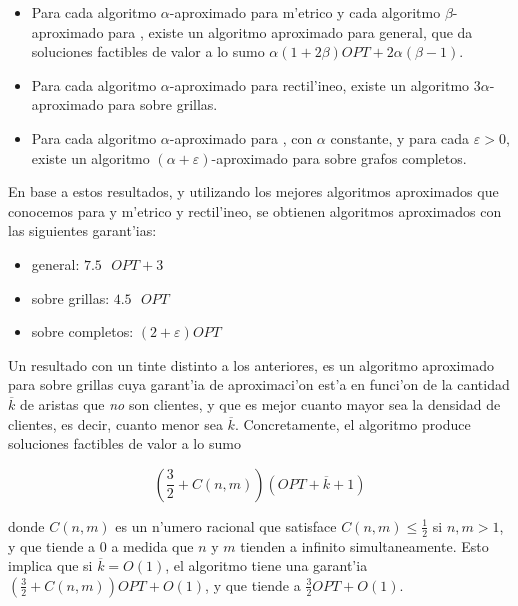 \begin{itemize}
	\item Para cada algoritmo $\alpha$-aproximado para  m'etrico y cada algoritmo $\beta$-aproximado para , existe un algoritmo aproximado para  general, que da soluciones factibles de valor a lo sumo $\alpha(1 + 2\beta) OPT + 2 \alpha(\beta - 1)$.
	
	\item Para cada algoritmo $\alpha$-aproximado para  rectil'ineo, existe un algoritmo $3\alpha$-aproximado para  sobre grillas.
	
	\item Para cada algoritmo $\alpha$-aproximado para , con $\alpha$ constante, y para cada $\varepsilon > 0$, existe un algoritmo $(\alpha + \varepsilon)$-aproximado para  sobre grafos completos.
\end{itemize}

\noindent
En base a estos resultados, y utilizando los mejores algoritmos aproximados que conocemos para  y  m'etrico y rectil'ineo, se obtienen algoritmos aproximados con las siguientes garant'ias:

\begin{itemize}
	\item {} general: $7.5\text{ }OPT + 3$
	\item {} sobre grillas: $4.5\text{ }OPT$
	\item {} sobre completos: $(2 + \varepsilon)OPT$
\end{itemize}

Un resultado con un tinte distinto a los anteriores, es un algoritmo aproximado para  sobre grillas cuya garant'ia de aproximaci'on est'a en funci'on de la cantidad $\overline{k}$ de aristas que \emph{no} son clientes, y que es mejor cuanto mayor sea la densidad de clientes, es decir, cuanto menor sea $\overline{k}$. Concretamente, el algoritmo produce soluciones factibles de valor a lo sumo

\[\left(\frac{3}{2} + C(n, m)\right) (OPT + \overline{k} + 1)\]

\noindent
donde $C(n, m)$ es un n'umero racional que satisface $C(n, m) \leq \frac{1}{2}$ si $n, m > 1$, y que tiende a $0$ a medida que $n$ y $m$ tienden a infinito simultaneamente. Esto implica que si $\overline{k} = O(1)$, el algoritmo tiene una garant'ia $(\frac{3}{2} + C(n, m)) OPT + O(1)$, y que tiende a $\frac{3}{2} OPT + O(1)$.\\

